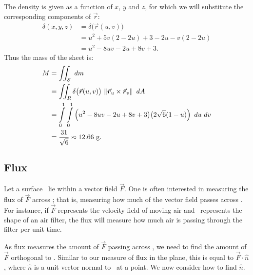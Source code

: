 \begin{example}
The density is given as a function of $x$, $y$ and $z$, for which we will substitute the corresponding components of $\vec r$: 
\begin{align*}
\delta(x,y,z) &= \delta\big(\vec r(u,v) \big) \\
			&= u^2 + 5v(2-2u)+3-2u-v(2-2u)\\
			&= u^2-8uv-2u+8v+3.
\end{align*}
Thus the mass of the sheet is:
\begin{align*}
M &= \iint_\surfaceS\ dm\\
	&= \iint_R \delta\big(\vec r(u,v)\big)\ \norm{\vec r_u\times \vec r_v}\ dA\\
	&= \int\limits_0^1\int\limits_0^1 \left(u^2-8uv-2u+8v+3\big)\big(2\sqrt{6}(1-u)\right)\ du\ dv\\
	&= \frac{31}{\sqrt{6}} \approx 12.66 \text{ g.}
\end{align*}

\end{example}

\subsection{Flux}

	\checkoddpage
{}
Let a surface \surfaceS\ lie within a vector field $\vec F$. One is often interested in measuring the flux of $\vec F$ across \surfaceS; that is, measuring how much of the vector field passes across \surfaceS. For instance, if $\vec F$ represents the velocity field of moving air and \surfaceS\ represents the shape of an air filter, the flux will measure how much air is passing through the filter per unit time.

As flux measures the amount of $\vec F$ passing across \surfaceS, we need to find the amount of $\vec F$ orthogonal to \surfaceS. Similar to our measure of flux in the plane, this is equal to $\vec F\cdot \hat n$, where $\hat n$ is a unit vector normal to \surfaceS\ at a point. We now consider how to find $\hat n$.

